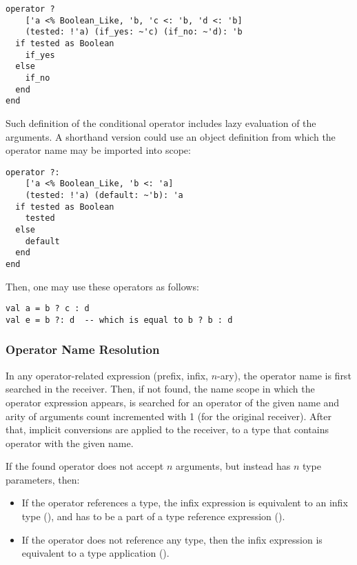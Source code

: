 \begin{lstlisting}
operator ? 
    ['a <% Boolean_Like, 'b, 'c <: 'b, 'd <: 'b]
    (tested: !'a) (if_yes: ~'c) (if_no: ~'d): 'b
  if tested as Boolean
    if_yes
  else
    if_no
  end
end
\end{lstlisting}

Such definition of the conditional operator includes lazy evaluation of the arguments. A shorthand version could use an object definition from which the operator name may be imported into scope:

\begin{lstlisting}
operator ?: 
    ['a <% Boolean_Like, 'b <: 'a]
    (tested: !'a) (default: ~'b): 'a
  if tested as Boolean
    tested
  else
    default
  end
end
\end{lstlisting}

Then, one may use these operators as follows: 

\begin{lstlisting}
val a = b ? c : d
val e = b ?: d  -- which is equal to b ? b : d
\end{lstlisting}





\subsubsection{Operator Name Resolution}

In any operator-related expression (prefix, infix, $n$-ary), the operator name is first searched in the receiver. Then, if not found, the name scope in which the operator expression appears, is searched for an operator of the given name and arity of arguments count incremented with 1 (for the original receiver). After that, implicit conversions are applied to the receiver, to a type that contains operator with the given name. 

If the found operator does not accept $n$ arguments, but instead has $n$ type parameters, then:
\begin{itemize} 
  \item If the operator references a type, the infix expression is equivalent to an infix type (), and has to be a part of a type reference expression (). 
  \item If the operator does not reference any type, then the infix expression is equivalent to a type application (). 
\end{itemize}





